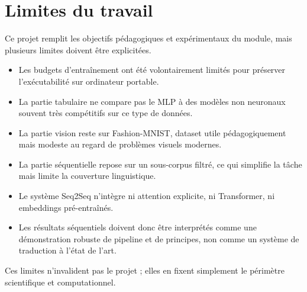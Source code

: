 \chapter{Limites du travail}

Ce projet remplit les objectifs pédagogiques et expérimentaux du module, mais plusieurs limites doivent être explicitées.

\begin{itemize}[leftmargin=1.2cm]
    \item Les budgets d’entraînement ont été volontairement limités pour préserver l’exécutabilité sur ordinateur portable.
    \item La partie tabulaire ne compare pas le MLP à des modèles non neuronaux souvent très compétitifs sur ce type de données.
    \item La partie vision reste sur Fashion-MNIST, dataset utile pédagogiquement mais modeste au regard de problèmes visuels modernes.
    \item La partie séquentielle repose sur un sous-corpus filtré, ce qui simplifie la tâche mais limite la couverture linguistique.
    \item Le système Seq2Seq n’intègre ni attention explicite, ni Transformer, ni embeddings pré-entraînés.
    \item Les résultats séquentiels doivent donc être interprétés comme une démonstration robuste de pipeline et de principes, non comme un système de traduction à l’état de l’art.
\end{itemize}

Ces limites n’invalident pas le projet ; elles en fixent simplement le périmètre scientifique et computationnel.

